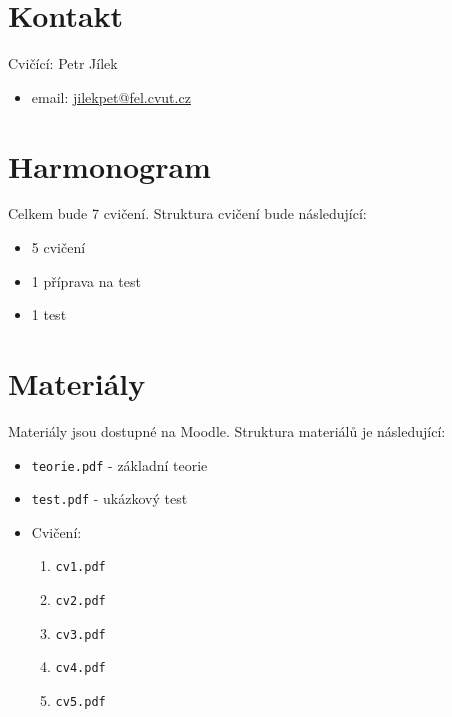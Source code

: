 \documentclass{article}
\begin{document}
\maketitle
\tableofcontents
\newpage



\section{Kontakt}

Cvičící: Petr Jílek
\begin{itemize}
    \item email: \href{mailto:jilekpet@fel.cvut.cz}{jilekpet@fel.cvut.cz}
\end{itemize}



\section{Harmonogram}
Celkem bude 7 cvičení. Struktura cvičení bude následující:

\begin{itemize}
    \item 5 cvičení
    \item 1 příprava na test
    \item 1 test
\end{itemize}



\section{Materiály}
Materiály jsou dostupné na Moodle. Struktura materiálů je následující:

\begin{itemize}
    \item \texttt{teorie.pdf} - základní teorie
    \item \texttt{test.pdf} - ukázkový test
    \item Cvičení:
          \begin{enumerate}
              \item \texttt{cv1.pdf}
              \item \texttt{cv2.pdf}
              \item \texttt{cv3.pdf}
              \item \texttt{cv4.pdf}
              \item \texttt{cv5.pdf}
          \end{enumerate}
\end{itemize}
\end{document}
